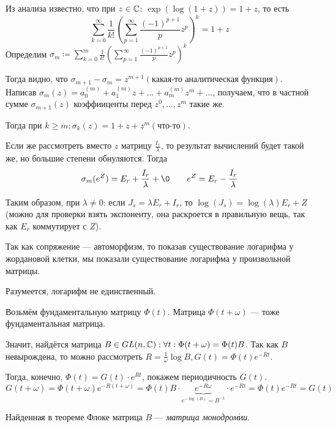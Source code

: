 \documentclass[a4paper]{report}
\begin{document}
{{{{{                        Из анализа известно, что при $z \in \mathbb{C}$: $\exp(\log(1 + z)) = 1 + z$, то есть
                        \[\sum\limits_{k = 0}^{\infty}\frac{1}{k!}\left(\sum\limits_{p = 1}^{\infty}\frac{(-1)^{p + 1}}p z^p\right)^k = 1 + z\]
                        Определим $\sigma_m \coloneqq \sum\limits_{k = 0}^{m}\frac{1}{k!}\left(\sum\limits_{p = 1}^{\infty}\frac{(-1)^{p + 1}}p z^p\right)^k$

                        Тогда видно, что $\sigma_{m + 1} - \sigma_m = z^{m+1} (\text{какая-то аналитическая функция})$.
                        Написав $\sigma_m(z) = a_0^{(m)} + a_1^{(m)}z + \dots + a_m^{(m)}z^m + \dots$, получаем, что в частной сумме $\sigma_{m + 1}(z)$ коэффииценты перед $z^0, \dots, z^m$ такие же.

                        Тогда при $k \ge m: \sigma_k(z) = 1 + z + z^m(\text{что-то})$.

                        Если же рассмотреть вместо $z$ матрицу $\frac{I_r}{\lambda}$, то результат вычислений будет такой же, но большие степени обнуляются.
                        Тогда \[\sigma_m(e^Z) = E_r + \frac{I_r}{\lambda} + \0\qquad e^Z = E_r - \frac{I_r}{\lambda}\]
                    }

                    Таким образом, при $\lambda \ne 0$: если $J_s = \lambda E_r + I_r$, то $\log(J_s) = \log(\lambda) E_r + Z$ (можно для проверки взять экспоненту, она раскроется в правильную вещь, так как $E_r$ коммутирует с $Z$).

                    Так как сопряжение --- автоморфизм, то показав существование логарифма у жордановой клетки, мы показали существование логарифма у произвольной матрицы.

                    Разумеется, логарифм не единственный.
                }
            }
            Возьмём фундаментальную матрицу $\Phi(t)$.
            Матрица $\Phi(t + \omega)$ --- тоже фундаментальная матрица.

            Значит, найдётся матрица $B \in GL(n, \mathbb{C}): \forall t: \Phi(t + \omega) = \Phi(t)B$.
            Так как $B$ невырождена, то можно рассмотреть $R = \frac{1}{\omega}\log B, G(t) = \Phi(t)e^{-Rt}$.

            Тогда, конечно, $\Phi(t) = G(t) \cdot e^{Rt}$, покажем периодичность $G(t)$.
            \[G(t + \omega) = \Phi(t + \omega)e^{-R(t + \omega)} = \Phi(t)B \cdot \underbrace{e^{-R\omega}}_{e^{-\log(B)} = B^{-1}} \cdot e^{-R t} = \Phi(t)e^{-Rt} = G(t)\]
        }
    }
    Найденная в теореме Флоке матрица $B$ --- \emph{матрица монодром$\acute{\text{и}}$и}.
\end{document}
